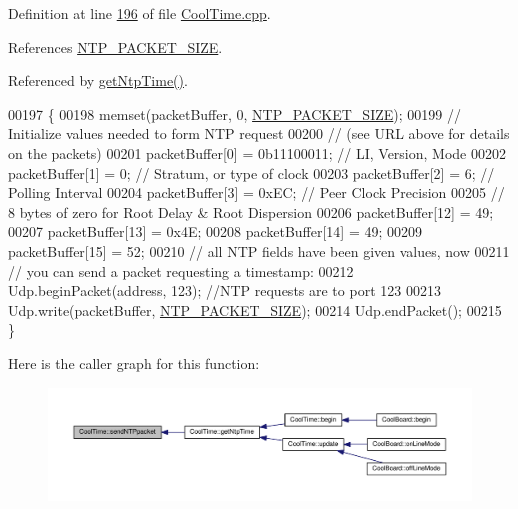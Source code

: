 Definition at line \hyperlink{_cool_time_8cpp_source_l00196}{196} of file \hyperlink{_cool_time_8cpp_source}{Cool\+Time.\+cpp}.



References \hyperlink{_cool_time_8h_source_l00022}{N\+T\+P\+\_\+\+P\+A\+C\+K\+E\+T\+\_\+\+S\+I\+ZE}.



Referenced by \hyperlink{_cool_time_8cpp_source_l00161}{get\+Ntp\+Time()}.


\begin{DoxyCode}
00197 \{
00198     memset(packetBuffer, 0, \hyperlink{_cool_time_8h_a56a6ea64006651b4f42adf713e244f06}{NTP\_PACKET\_SIZE});
00199     \textcolor{comment}{// Initialize values needed to form NTP request}
00200     \textcolor{comment}{// (see URL above for details on the packets)}
00201     packetBuffer[0] = 0b11100011;   \textcolor{comment}{// LI, Version, Mode}
00202     packetBuffer[1] = 0;     \textcolor{comment}{// Stratum, or type of clock}
00203     packetBuffer[2] = 6;     \textcolor{comment}{// Polling Interval}
00204     packetBuffer[3] = 0xEC;  \textcolor{comment}{// Peer Clock Precision}
00205     \textcolor{comment}{// 8 bytes of zero for Root Delay & Root Dispersion}
00206     packetBuffer[12]  = 49;
00207     packetBuffer[13]  = 0x4E;
00208     packetBuffer[14]  = 49;
00209     packetBuffer[15]  = 52;
00210     \textcolor{comment}{// all NTP fields have been given values, now}
00211     \textcolor{comment}{// you can send a packet requesting a timestamp:                 }
00212     Udp.beginPacket(address, 123); \textcolor{comment}{//NTP requests are to port 123}
00213     Udp.write(packetBuffer, \hyperlink{_cool_time_8h_a56a6ea64006651b4f42adf713e244f06}{NTP\_PACKET\_SIZE});
00214     Udp.endPacket();    
00215 \}
\end{DoxyCode}
Here is the caller graph for this function\+:
\nopagebreak
\begin{figure}[H]
\begin{center}
\leavevmode
\includegraphics[width=350pt]{class_cool_time_a236a38d120dc53bc67456d763838c5a1_icgraph}
\end{center}
\end{figure}
\mbox{\label{class_cool_time_ab81ea7fdaace111aa01cc1ec84c6d297}} 
